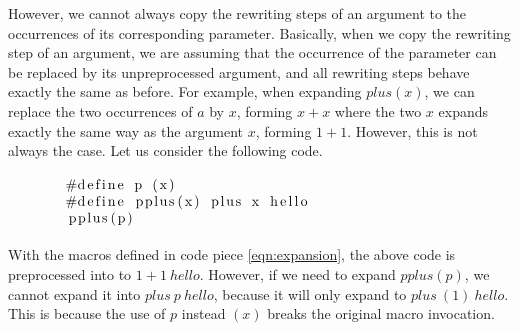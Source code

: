 
However, we cannot always copy the rewriting steps of an argument to
the occurrences of its corresponding parameter. Basically, when we
copy the rewriting step of an argument, we are assuming that the
occurrence of the parameter can be replaced by its unpreprocessed
argument, and all rewriting steps behave exactly the same as before.
For example, when expanding $plus(x)$, we can replace the two
occurrences of $a$ by $x$, forming $x+x$ where the two $x$ expands
exactly the same way as the argument $x$, forming $1+1$. However, this is
not always the case. Let us consider the following code.
\begin{equation}\label{eqn:expandToParentheses}
  \begin{minipage}{0.8\columnwidth}
\begin{lstlisting}
#define p (x)
#define pplus(x) plus x hello
pplus(p)  
\end{lstlisting}
    \end{minipage}
\end{equation}
With the macros defined in code piece \ref{eqn:expansion}, the above code
is preprocessed into to $1+1\ hello$. However, if we need to expand
$pplus(p)$, we cannot expand it into $plus\ p\ hello$, because it will
only expand to $plus\ (1)\ hello$. This is because the use of $p$
instead $(x)$ breaks the original macro invocation. %

